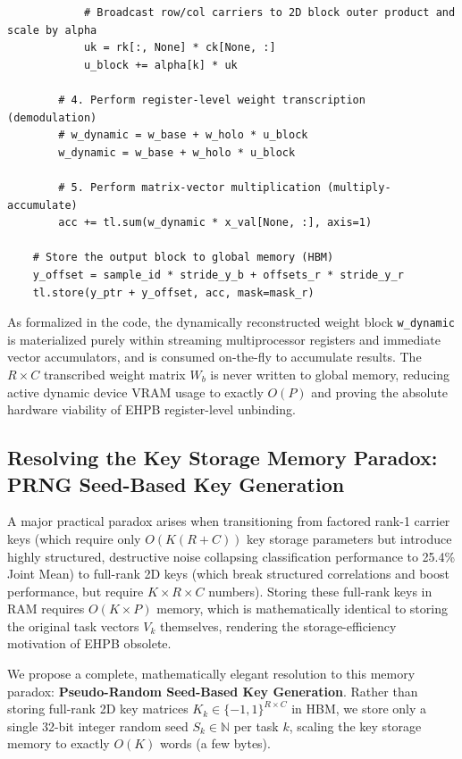 \documentclass{article}
\theoremstyle{plain}
\theoremstyle{definition}
\theoremstyle{remark}
\begin{document}
\begin{verbatim}
            # Broadcast row/col carriers to 2D block outer product and scale by alpha
            uk = rk[:, None] * ck[None, :]
            u_block += alpha[k] * uk
            
        # 4. Perform register-level weight transcription (demodulation)
        # w_dynamic = w_base + w_holo * u_block
        w_dynamic = w_base + w_holo * u_block
        
        # 5. Perform matrix-vector multiplication (multiply-accumulate)
        acc += tl.sum(w_dynamic * x_val[None, :], axis=1)
        
    # Store the output block to global memory (HBM)
    y_offset = sample_id * stride_y_b + offsets_r * stride_y_r
    tl.store(y_ptr + y_offset, acc, mask=mask_r)
\end{verbatim}

As formalized in the code, the dynamically reconstructed weight block {\tt w\_dynamic} is materialized purely within streaming multiprocessor registers and immediate vector accumulators, and is consumed on-the-fly to accumulate results. The $R \times C$ transcribed weight matrix $W_b$ is never written to global memory, reducing active dynamic device VRAM usage to exactly $O(P)$ and proving the absolute hardware viability of EHPB register-level unbinding.

\subsection{Resolving the Key Storage Memory Paradox: PRNG Seed-Based Key Generation}
\label{app:prng_key_generation}

A major practical paradox arises when transitioning from factored rank-1 carrier keys (which require only $O(K(R+C))$ key storage parameters but introduce highly structured, destructive noise collapsing classification performance to 25.4\% Joint Mean) to full-rank 2D keys (which break structured correlations and boost performance, but require $K \times R \times C$ numbers). Storing these full-rank keys in RAM requires $O(K \times P)$ memory, which is mathematically identical to storing the original task vectors $V_k$ themselves, rendering the storage-efficiency motivation of EHPB obsolete.

We propose a complete, mathematically elegant resolution to this memory paradox: \textbf{Pseudo-Random Seed-Based Key Generation}. Rather than storing full-rank 2D key matrices $K_k \in \{-1, 1\}^{R \times C}$ in HBM, we store only a single 32-bit integer random seed $S_k \in \mathbb{N}$ per task $k$, scaling the key storage memory to exactly $O(K)$ words (a few bytes).
\end{document}
